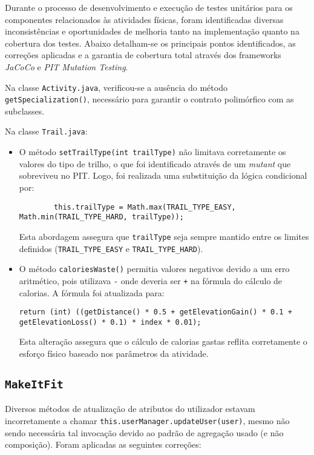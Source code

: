 \documentclass[12pt, a4paper]{article}
\begin{document}
Durante o processo de desenvolvimento e execução de testes unitários para os componentes
relacionados às atividades físicas, foram identificadas diversas inconsistências e oportunidades de
melhoria tanto na implementação quanto na cobertura dos testes. Abaixo detalham-se os principais
pontos identificados, as correções aplicadas e a garantia de cobertura total através dos frameworks
\emph{JaCoCo} e \emph{PIT Mutation Testing}.

Na classe \texttt{Activity.java}, verificou-se a ausência do método \texttt{getSpecialization()},
necessário para garantir o contrato polimórfico com as subclasses.

Na classe \texttt{Trail.java}:
\begin{itemize}
  \item O método \texttt{setTrailType(int trailType)} não limitava corretamente os valores do tipo
  de trilho, o que foi identificado através de um \emph{mutant} que sobreviveu no PIT. Logo, foi
  realizada uma substituição da lógica condicional por:
  \begin{verbatim}
        this.trailType = Math.max(TRAIL_TYPE_EASY, Math.min(TRAIL_TYPE_HARD, trailType));
  \end{verbatim}
  Esta abordagem assegura que \texttt{trailType} seja sempre mantido entre os limites definidos
  (\texttt{TRAIL_TYPE_EASY} e \texttt{TRAIL_TYPE_HARD}).

  \item O método \texttt{caloriesWaste()} permitia valores negativos devido a um erro aritmético,
  pois utilizava \texttt{-} onde deveria ser \texttt{+} na fórmula do cálculo de calorias. A fórmula
  foi atualizada para:
  \begin{verbatim}
return (int) ((getDistance() * 0.5 + getElevationGain() * 0.1 + getElevationLoss() * 0.1) * index * 0.01);
  \end{verbatim}
  Esta alteração assegura que o cálculo de calorias gastas reflita corretamente o esforço físico
  baseado nos parâmetros da atividade.
\end{itemize}

\subsection{\texttt{MakeItFit}}

Diversos métodos de atualização de atributos do utilizador estavam incorretamente a chamar
\texttt{this.userManager.updateUser(user)}, mesmo não sendo necessária tal invocação devido ao
padrão de agregação usado (e não composição). Foram aplicadas as seguintes correções:
\end{document}
